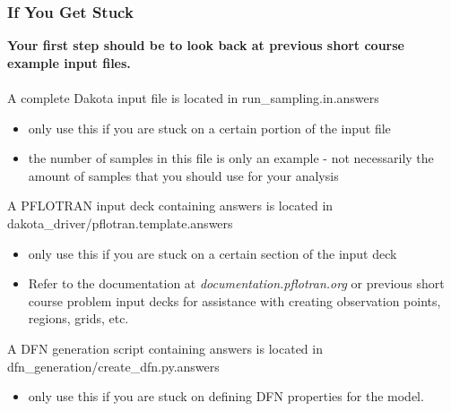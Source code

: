 \documentclass{beamer}
\begin{document}
\begin{frame}[fragile]\frametitle{If You Get Stuck}
\textbf{Your first step should be to look back at previous short course example input files.}\\
\textbf{   }\\
A complete Dakota input file is located in run\_sampling.in.answers
\begin{itemize}
    \item only use this if you are stuck on a certain portion of the input file
    \item the number of samples in this file is only an example - not necessarily the amount of samples that you should use for your analysis
\end{itemize}
A PFLOTRAN input deck containing answers is located in dakota\_driver/pflotran.template.answers
\begin{itemize}
  \item only use this if you are stuck on a certain section of the input deck
  \item Refer to the documentation at \textit{documentation.pflotran.org} or previous short course problem input decks for assistance with creating observation points, regions, grids, etc. 
\end{itemize} 
A DFN generation script containing answers is located in dfn\_generation/create\_dfn.py.answers
\begin{itemize}
	\item only use this if you are stuck on defining DFN properties for the model.
\end{itemize} 
\end{frame}
\end{document}
